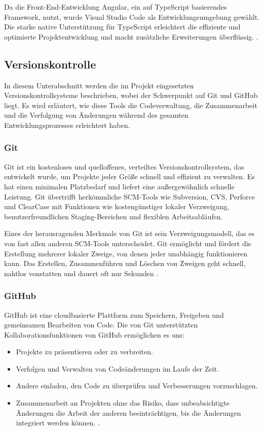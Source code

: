 Da die Front-End-Entwicklung Angular, ein auf TypeScript basierendes Framework, nutzt, wurde Visual Studio Code als Entwicklungsumgebung gewählt. Die starke native Unterstützung für TypeScript erleichtert die effiziente und optimierte Projektentwicklung und macht zusätzliche Erweiterungen überflüssig. \cite{visualstudio-angular:o.J}.

\subsection{Versionskontrolle}
In diesem Unterabschnitt werden die im Projekt eingesetzten Versionskontrollsysteme beschrieben, wobei der Schwerpunkt auf Git und GitHub liegt. Es wird erläutert, wie diese Tools die Codeverwaltung, die Zusammenarbeit und die Verfolgung von Änderungen während des gesamten Entwicklungsprozesses erleichtert haben.
\subsubsection{Git}
Git ist ein kostenloses und quelloffenes, verteiltes Versionskontrollsystem, das entwickelt wurde, um Projekte jeder Größe schnell und effizient zu verwalten. Es hat einen minimalen Platzbedarf und liefert eine außergewöhnlich schnelle Leistung. Git übertrifft herkömmliche SCM-Tools wie Subversion, CVS, Perforce und ClearCase mit Funktionen wie kostengünstiger lokaler Verzweigung, benutzerfreundlichen Staging-Bereichen und flexiblen Arbeitsabläufen.

Eines der herausragenden Merkmale von Git ist sein Verzweigungsmodell, das es von fast allen anderen SCM-Tools unterscheidet. Git ermöglicht und fördert die Erstellung mehrerer lokaler Zweige, von denen jeder unabhängig funktionieren kann. Das Erstellen, Zusammenführen und Löschen von Zweigen geht schnell, nahtlos vonstatten und dauert oft nur Sekunden  \cite{git-scmr:o.J}.

\subsubsection{GitHub}
GitHub ist eine cloudbasierte Plattform zum Speichern, Freigeben und gemeinsamen Bearbeiten von Code. Die von Git unterstützten Kollaborationsfunktionen von GitHub ermöglichen es uns:

\begin{itemize}
	\item Projekte zu präsentieren oder zu verbreiten.
	\item Verfolgen und Verwalten von Codeänderungen im Laufe der Zeit.
	\item Andere einladen, den Code zu überprüfen und Verbesserungen vorzuschlagen.
	\item Zusammenarbeit an Projekten ohne das Risiko, dass unbeabsichtigte Änderungen die Arbeit der anderen beeinträchtigen, bis die Änderungen integriert werden können.  \cite{github:o.J}.
\end{itemize} 














